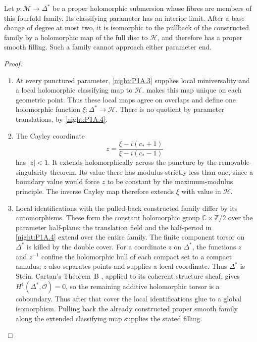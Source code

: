 \begin{theorem}\hypertarget{tag-02R6}{}\label{night:P1A.6}
Let $p:\mathcal M\to\Delta^*$ be a proper holomorphic submersion
whose fibres are members of this fourfold family. Its classifying
parameter has an interior limit. After a base change of degree at most two, it is
isomorphic to the pullback of the constructed family by
a holomorphic map of the full disc to $\mathcal H$, and
therefore has a proper smooth filling. Such a family
cannot approach either parameter end.
\end{theorem}
\begin{proof}
\begin{enumerate}[label={$\langle1\rangle$\arabic*.}]
\item At every punctured parameter, \cref{night:P1A.3} supplies local
miniversality and a local holomorphic classifying map to
$\mathcal H$.  makes this map unique on each geometric
point. Thus these local maps agree on overlaps and define
one holomorphic function $\xi:\Delta^*\to\mathcal H$.
There is no quotient by parameter translations, by \cref{night:P1A.4}.

\item The Cayley coordinate
\[
 z=\frac{\xi-i(c_*+1)}{\xi-i(c_*-1)}
\]
has $|z|<1$. It extends holomorphically across the puncture
by the removable-singularity theorem. Its value there has
modulus strictly less than one, since a boundary value
would force $z$ to be constant by the maximum-modulus
principle. The inverse Cayley map therefore extends
$\xi$ with value in $\mathcal H$.

\item Local identifications with the pulled-back constructed
family differ by its automorphisms. These form the constant
holomorphic group $\mathbb C\times\mathbb Z/2$ over the
parameter half-plane: the translation field and the
half-period in \cref{night:P1A.4} extend over the entire family.
The finite component torsor on $\Delta^*$ is killed by
the double cover. For a coordinate $z$ on $\Delta^*$, the functions $z$ and $z^{-1}$
confine the holomorphic hull of each compact set to a compact annulus;
$z$ also separates points and supplies a local coordinate. Thus
$\Delta^*$ is Stein. Cartan's Theorem~B
\cite[Expos\'e~19, \S5, pp.~19-14--19-15]{Cartan1952B_AB},
applied to its coherent structure sheaf, gives
$H^1(\Delta^*,\mathcal O)=0$, so the remaining additive
holomorphic torsor is a coboundary. Thus after that cover the local
identifications glue to a global isomorphism. Pulling
back the already constructed proper smooth family along
the extended classifying map supplies the stated filling.

\end{enumerate}
\end{proof}



